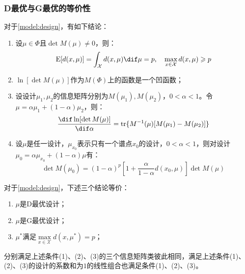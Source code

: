 \subsubsection{D最优与G最优的等价性}
\begin{lemma}
	对于\cref{model:design}，有如下结论：
	\begin{enumerate}
		\item 设$\mu\in\Phi$且$\det M(\mu)\ne0$，则：
		\begin{equation*}
			\operatorname{E}[d(x,\mu)]=\int_{\mathcal{X}}d(x,\mu)\dif\mu=p,\quad\max_{x\in\mathcal{X}}d(x,\mu)\geqslant p
		\end{equation*}
		\item $\ln[\det M(\mu)]$作为$M(\Phi)$上的函数是一个凹函数；
		\item 设设计$\mu_1,\mu_2$的信息矩阵分别为$M(\mu_1),M(\mu_2)$，$0<\alpha<1$。令$\mu=\alpha\mu_1+(1-\alpha)\mu_2$，则：
		\begin{equation*}
			\frac{\dif\ln[\det M(\mu)]}{\dif\alpha}=\operatorname{tr}\{M^{-1}(\mu)[M(\mu_1)-M(\mu_2)]\}
		\end{equation*}
		\item 设$\mu$是任一设计，$\mu_{x_0}$表示只有一个谱点$x_0$的设计，$0<\alpha<1$，则对设计$\mu_0=\alpha\mu_{x_0}+(1-\alpha)\mu$有：
		\begin{equation*}
			\det M(\mu_0)=(1-\alpha)^p\left[1+\frac{\alpha}{1-\alpha}d(x_0,\mu)\right]\det M(\mu)
		\end{equation*}
	\end{enumerate}
\end{lemma}
\begin{theorem}
	对于\cref{model:design}，下述三个结论等价：
	\begin{enumerate}
		\item $\mu$是D最优设计；
		\item $\mu$是G最优设计；
		\item $\mu^*$满足$\max\limits_{x\in\mathcal{X}}d(x,\mu^*)=p$；
	\end{enumerate}
	分别满足上述条件(1)、(2)、(3)的三个信息矩阵类彼此相同，满足上述条件(1)、(2)、(3)的设计的系数和为$1$的线性组合也满足条件(1)、(2)、(3)。
\end{theorem}
